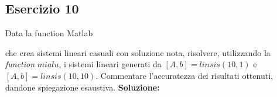 \subsection{Esercizio 10}
Data la function Matlab

che crea sistemi lineari casuali con soluzione nota, risolvere, utilizzando la \textit{function} $mialu$, i sistemi
lineari generati da $[A,b]=linsis(10,1)$ e $[A,b]=linsis(10,10)$. Commentare l'accuratezza dei
risultati ottenuti, dandone spiegazione esaustiva.
\newline \textbf{Soluzione:} \newline
